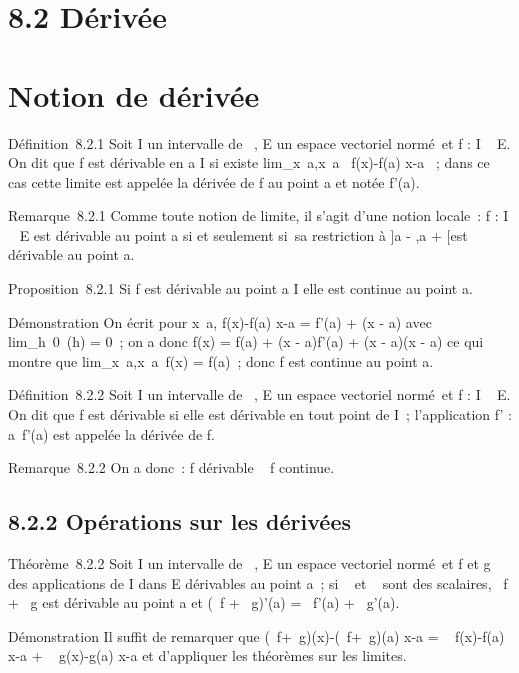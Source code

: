 
\section{8.2 Dérivée}

\section{Notion de dérivée}
\label{sec:notion-de-derivee}



Définition~8.2.1 Soit I un intervalle de ~, E un espace vectoriel
normé~et f : I \rightarrow~ E. On dit que f est dérivable en a \in I si existe
lim_x\rightarrow~a,x\neq~a~
f(x)-f(a) \over x-a ~; dans ce cas cette limite est
appelée la dérivée de f au point a et notée f'(a).

Remarque~8.2.1 Comme toute notion de limite, il s'agit d'une notion
locale~: f : I \rightarrow~ E est dérivable au point a si et seulement si~sa
restriction à ]a - \eta,a + \eta[\bigcapI est dérivable au point a.

Proposition~8.2.1 Si f est dérivable au point a \in I elle est continue au
point a.

Démonstration On écrit pour x\neq~a,  f(x)-f(a)
\over x-a = f'(a) + \epsilon(x - a) avec
lim_h\rightarrow~0~\epsilon(h) = 0~; on a donc f(x) =
f(a) + (x - a)f'(a) + (x - a)\epsilon(x - a) ce qui montre que
lim_x\rightarrow~a,x\neq~a~f(x)
= f(a)~; donc f est continue au point a.

Définition~8.2.2 Soit I un intervalle de ~, E un espace vectoriel
normé~et f : I \rightarrow~ E. On dit que f est dérivable si elle est dérivable en
tout point de I~; l'application f' : a\mapsto~f'(a)
est appelée la dérivée de f.

Remarque~8.2.2 On a donc~: f dérivable \rigtharrow~ f continue.

\subsection{8.2.2 Opérations sur les dérivées}

Théorème~8.2.2 Soit I un intervalle de ~, E un espace vectoriel normé~et
f et g des applications de I dans E dérivables au point a~; si \alpha~ et \beta~
sont des scalaires, \alpha~f + \beta~g est dérivable au point a et (\alpha~f + \beta~g)'(a) =
\alpha~f'(a) + \beta~g'(a).

Démonstration Il suffit de remarquer que  (\alpha~f+\beta~g)(x)-(\alpha~f+\beta~g)(a)
\over x-a = \alpha~ f(x)-f(a) \over x-a +
\beta~ g(x)-g(a) \over x-a et d'appliquer les théorèmes
sur les limites.

